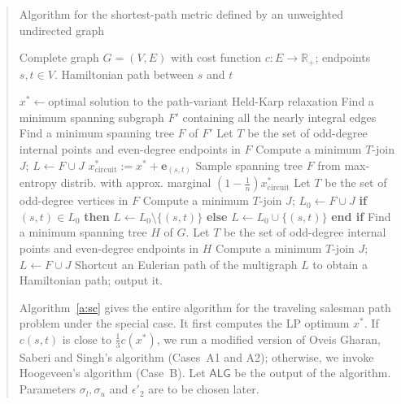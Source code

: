 \documentclass[11pt,letterpaper]{article}
\begin{document}
\begin{quote}
\begin{algorithm}[b!]
\caption{Algorithm for the shortest-path metric defined by an unweighted undirected graph}
\label{a:sc}
\begin{algorithmic}[1]
	\REQUIRE Complete graph $G=(V,E)$ with cost function $c:E\to\mathbb{R}_+$; endpoints $s,t\in V$.
	\ENSURE Hamiltonian path between $s$ and $t$

	\STATE $x^*\gets$optimal solution to the path-variant Held-Karp relaxation
			\STATE Find a minimum spanning subgraph $F'$ containing all the nearly integral edges
			\STATE Find a minimum spanning tree $F$ of $F'$
			\STATE Let $T$ be the set of odd-degree internal points and even-degree endpoints in $F$
			\STATE Compute a minimum $T$-join $J$; $L \gets F\cup J$
		\ELSE[Case A2]
			\STATE $x^*_{\mathrm{circuit}} := x^*+\mathbf{\mathbf{e}}_{(s,t)}$
			\STATE Sample spanning tree $F$ from max-entropy distrib. with approx. marginal $(1-\frac{1}{n}) x^*_{\mathrm{circuit}}$\hspace*{-5em}
			\STATE Let $T$ be the set of odd-degree vertices in $F$
			\STATE Compute a minimum $T$-join $J$; $L_0 \gets F\cup J$
			\STATE \textbf{if} $(s,t)\in L_0$ \textbf{then} $L\gets L_0 \setminus\{(s,t)\}$ \textbf{else} $L\gets L_0 \cup\{(s,t)\}$ \textbf{end if}
		\ENDIF
		\STATE Find a minimum spanning tree $H$ of $G$.
		\STATE Let $T$ be the set of odd-degree internal points and even-degree endpoints in $H$
		\STATE Compute a minimum $T$-join $J$; $L \gets F\cup J$
	\ENDIF
	\STATE Shortcut an Eulerian path of the multigraph $L$ to obtain a Hamiltonian path; output it.
\end{algorithmic}
\end{algorithm}

Algorithm~\ref{a:sc} gives the entire algorithm for the traveling salesman path problem under the special case. It first computes the LP optimum $x^*$. If $c(s,t)$ is close to $\frac{1}{3}c(x^*)$, we run a modified version of Oveis Gharan, Saberi and Singh's algorithm (Cases~A1 and A2); otherwise, we invoke Hoogeveen's algorithm (Case~B). Let $\mathsf{ALG}$ be the output of the algorithm. Parameters $\sigma_l,\sigma_u$ and $\epsilon'_2$ are to be chosen later.


\end{quote}
\end{document}
